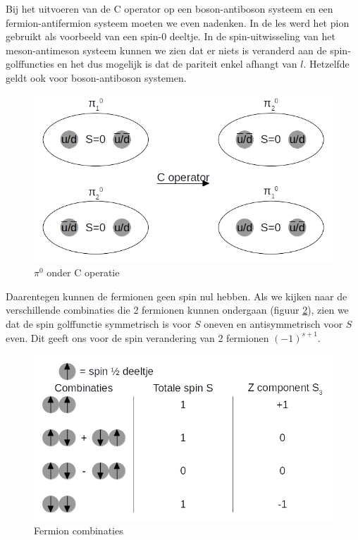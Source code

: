 \documentclass[../main.tex]{subfiles}
\begin{document}
Bij het uitvoeren van de C operator op een boson-antiboson systeem en een fermion-antifermion systeem moeten we even nadenken. In de les werd het pion gebruikt als voorbeeld van een spin-0 deeltje. In de spin-uitwisseling van het meson-antimeson systeem kunnen we zien dat er niets is veranderd aan de spin-golffuncties en het dus mogelijk is dat de pariteit enkel afhangt van $l$. Hetzelfde geldt ook voor boson-antiboson systemen.

\begin{figure}[h]
    \centering
    \includegraphics[width=0.8\linewidth]{quantum_numbers/baryon_c_operator.jpg}
    \caption{$\pi^0$ onder C operatie}%
    \label{fig:baryon_c_operator}
\end{figure}

Daarentegen kunnen de fermionen geen spin nul hebben. Als we kijken naar de verschillende combinaties die 2 fermionen kunnen ondergaan (figuur \ref{fig:fermion_c_operator}), zien we dat de spin golffunctie symmetrisch is voor $S$ oneven en antisymmetrisch voor $S$ even. Dit geeft ons voor de spin verandering van 2 fermionen $(-1)^{s+1}$.

\begin{figure}[h]
    \centering
    \includegraphics[width=0.8\linewidth]{quantum_numbers/fermion_c_operator.jpg}
    \caption{Fermion combinaties}%
    \label{fig:fermion_c_operator}
\end{figure}
\end{document}
